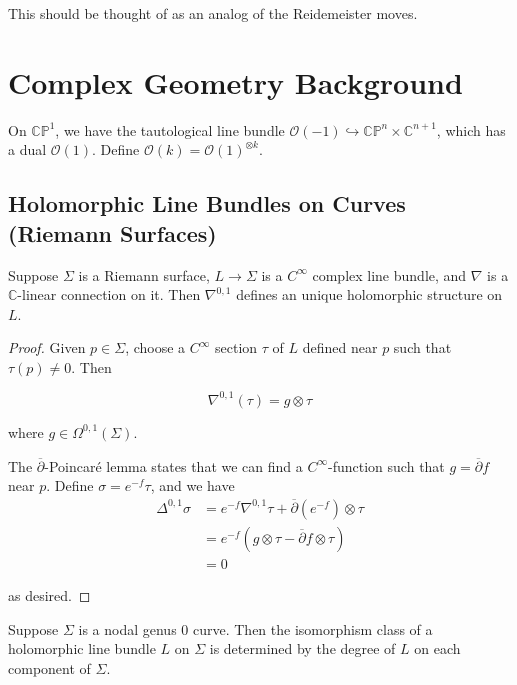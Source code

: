 This should be thought of as an analog of the Reidemeister moves.

\section{Complex Geometry Background}

On $\mathbb{CP}^1$, we have the tautological line bundle $\mathcal{O}(-1)\hookrightarrow \mathbb{CP}^n \times \mathbb{C}^{n+1}$, which has a dual $\mathcal{O}(1)$. Define $\mathcal{O}(k) = \mathcal{O}(1)^{\otimes k}$.

\subsection{Holomorphic Line Bundles on Curves (Riemann Surfaces)}

\begin{lemma}

Suppose $\Sigma$ is a Riemann surface, $L\to \Sigma$ is a $C^\infty$ complex line bundle, and $\nabla$ is a $\mathbb{C}$-linear connection on it. Then $\nabla^{0,1}$ defines an unique holomorphic structure on $L$.

\end{lemma}

\begin{proof}
Given $p\in \Sigma$, choose a $C^\infty$ section $\tau$ of $L$ defined near $p$ such that $\tau(p)\neq 0$. Then 

\[
\nabla^{0,1}(\tau) = g\otimes \tau
\]

where $g\in \Omega^{0,1}(\Sigma)$.

The $\overline{\partial}$-Poincaré lemma states that we can find a $C^\infty$-function such that $g=\overline{\partial}f$ near $p$. Define $\sigma = e^{-f}\tau$, and we have
\begin{align*}
\Delta^{0,1} \sigma &= e^{-f}\nabla^{0,1} \tau + \overline{\partial}(e^{-f})\otimes \tau \\
&= e^{-f}(g\otimes \tau - \overline{\partial}f \otimes \tau)\\
&= 0
\end{align*}

as desired.
\end{proof}

\begin{lemma}
Suppose $\Sigma$ is a nodal genus $0$ curve. Then the isomorphism class of a holomorphic line bundle $L$ on $\Sigma$ is determined by the degree of $L$ on each component of $\Sigma$.
\end{lemma}

